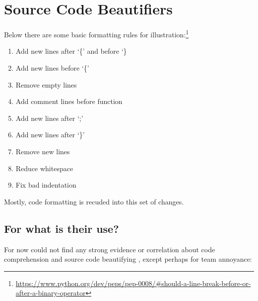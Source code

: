 

%


\chapter{Source Code Beautifiers}
\label{source_code_beautifiers}


Below there are some basic formatting rules for
illustration:\footnote{\url{https://www.python.org/dev/peps/pep-0008/#should-a-line-break-before-or-after-a-binary-operator}}

\medskip
\begin{enumerate}
    \item Add new lines after `\{' and before `\}
    \item Add new lines before `\{'
    \item Remove empty lines
    \item Add comment lines before function
    \item Add new lines after `;'
    \item Add new lines after `\}'
    \item Remove new lines
    \item Reduce whitespace
    \item Fix bad indentation
\end{enumerate}
\vspace{-4mm}\begin{flushright}\textcite{prettyPrinter}\end{flushright}

Mostly,
code formatting is recuded into this set of changes.



\section{For what is their use?}

For now could not find any strong evidence or correlation about code
comprehension and source code beautifying \cite{improvingCodeReadability},
except perhaps for team annoyance:

